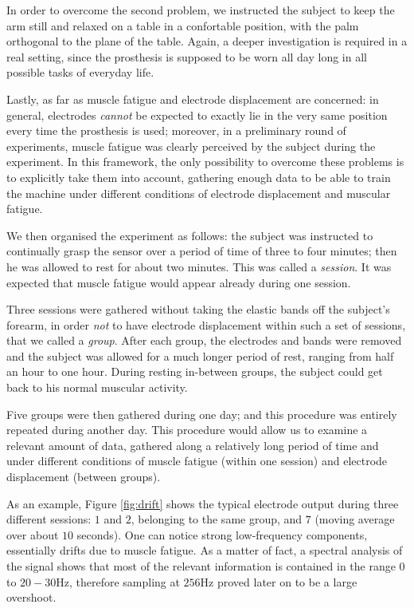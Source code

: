 In order to overcome the second problem, we instructed the subject to
keep the arm still and relaxed on a table in a confortable position,
with the palm orthogonal to the plane of the table. Again, a deeper
investigation is required in a real setting, since the prosthesis is
supposed to be worn all day long in all possible tasks of everyday
life.

Lastly, as far as muscle fatigue and electrode displacement are
concerned: in general, electrodes \emph{cannot} be expected to exactly
lie in the very same position every time the prosthesis is used;
moreover, in a preliminary round of experiments, muscle fatigue was
clearly perceived by the subject during the experiment. In this
framework, the only possibility to overcome these problems is to
explicitly take them into account, gathering enough data to be able to
train the machine under different conditions of electrode displacement
and muscular fatigue.

We then organised the experiment as follows: the subject was
instructed to continually grasp the sensor over a period of time of
three to four minutes; then he was allowed to rest for about two
minutes. This was called a \emph{session}. It was expected that muscle
fatigue would appear already during one session.

Three sessions were gathered without taking the elastic bands off the
subject's forearm, in order \emph{not} to have electrode displacement
within such a set of sessions, that we called a \emph{group}. After
each group, the electrodes and bands were removed and the subject was
allowed for a much longer period of rest, ranging from half an hour to
one hour. During resting in-between groups, the subject could get back
to his normal muscular activity.

Five groups were then gathered during one day; and this procedure was
entirely repeated during another day. This procedure would allow us to
examine a relevant amount of data, gathered along a relatively long
period of time and under different conditions of muscle fatigue
(within one session) and electrode displacement (between groups).

As an example, Figure \ref{fig:drift} shows the typical electrode
output during three different sessions: $1$ and $2$, belonging to the
same group, and $7$ (moving average over about $10$ seconds). One can
notice strong low-frequency components, essentially drifts due to
muscle fatigue. As a matter of fact, a spectral analysis of the signal
shows that most of the relevant information is contained in the range
$0$ to $20-30$Hz, therefore sampling at $256$Hz proved later on to be
a large overshoot.

